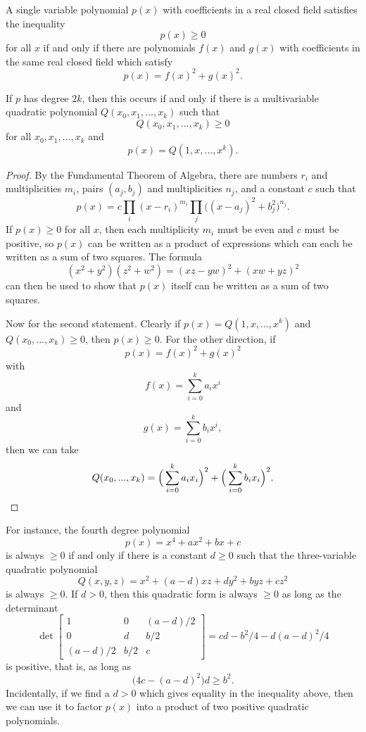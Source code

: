 \begin{thm} A single variable polynomial $p(x)$ with coefficients in a real closed field satisfies the inequality
\[
p(x) \ge 0
\]
for all $x$ if and only if there are polynomials $f(x)$ and $g(x)$ with coefficients in the same real closed field which satisfy
\[
p(x) = f(x)^2 + g(x)^2.
\]

If $p$ has degree $2k$, then this occurs if and only if there is a multivariable quadratic polynomial $Q(x_0, x_1, ..., x_k)$ such that
\[
Q(x_0, x_1, ..., x_k) \ge 0
\]
for all $x_0, x_1, ..., x_k$ and
\[
p(x) = Q(1, x, ..., x^k).
\]
\end{thm}
\begin{proof} By the Fundamental Theorem of Algebra, there are numbers $r_i$ and multiplicities $m_i$, pairs $(a_j, b_j)$ and multiplicities $n_j$, and a constant $c$ such that
\[
p(x) = c\prod_i (x - r_i)^{m_i} \prod_j \big((x-a_j)^2 + b_j^2\big)^{n_j}.
\]
If $p(x) \ge 0$ for all $x$, then each multiplicity $m_i$ must be even and $c$ must be positive, so $p(x)$ can be written as a product of expressions which can each be written as a sum of two squares. The formula
\[
(x^2 + y^2)(z^2 + w^2) = (xz - yw)^2 + (xw + yz)^2
\]
can then be used to show that $p(x)$ itself can be written as a sum of two squares.

Now for the second statement. Clearly if $p(x) = Q(1, x, ..., x^k)$ and $Q(x_0, ..., x_k) \ge 0$, then $p(x) \ge 0$. For the other direction, if
\[
p(x) = f(x)^2 + g(x)^2
\]
with
\[
f(x) = \sum_{i=0}^k a_i x^i
\]
and
\[
g(x) = \sum_{i=0}^k b_i x^i,
\]
then we can take
\[
Q(x_0, ..., x_k) = \Big(\sum_{i=0}^k a_ix_i\Big)^2 + \Big(\sum_{i=0}^k b_ix_i\Big)^2.\qedhere
\]
\end{proof}

For instance, the fourth degree polynomial
\[
p(x) = x^4 + ax^2 + bx + c
\]
is always $\ge 0$ if and only if there is a constant $d \ge 0$ such that the three-variable quadratic polynomial
\[
Q(x,y,z) = x^2 + (a-d)xz + dy^2 + byz + cz^2
\]
is always $\ge 0$. If $d > 0$, then this quadratic form is always $\ge 0$ as long as the determinant
\[
\det\begin{bmatrix} 1 & 0 & (a-d)/2\\ 0 & d & b/2\\ (a-d)/2 & b/2 & c\end{bmatrix} = cd - b^2/4 - d(a-d)^2/4
\]
is positive, that is, as long as
\[
\big(4c - (a-d)^2\big)d \ge b^2.
\]
Incidentally, if we find a $d > 0$ which gives equality in the inequality above, then we can use it to factor $p(x)$ into a product of two positive quadratic polynomials.


